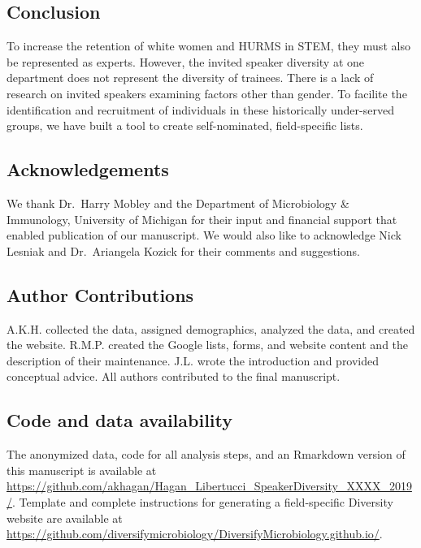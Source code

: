 \documentclass[10pt,]{article}
\begin{document}
\subsection{Conclusion}\label{conclusion}

To increase the retention of white women and HURMS in STEM, they must
also be represented as experts. However, the invited speaker diversity
at one department does not represent the diversity of trainees. There is
a lack of research on invited speakers examining factors other than
gender. To facilite the identification and recruitment of individuals in
these historically under-served groups, we have built a tool to create
self-nominated, field-specific lists.

\subsection{Acknowledgements}\label{acknowledgements}

We thank Dr.~Harry Mobley and the Department of Microbiology \&
Immunology, University of Michigan for their input and financial support
that enabled publication of our manuscript. We would also like to
acknowledge Nick Lesniak and Dr.~Ariangela Kozick for their comments and
suggestions.

\subsection{Author Contributions}\label{author-contributions}

A.K.H. collected the data, assigned demographics, analyzed the data, and
created the website. R.M.P. created the Google lists, forms, and website
content and the description of their maintenance. J.L. wrote the
introduction and provided conceptual advice. All authors contributed to
the final manuscript.

\subsection{Code and data
availability}\label{code-and-data-availability}

The anonymized data, code for all analysis steps, and an Rmarkdown
version of this manuscript is available at
\url{https://github.com/akhagan/Hagan_Libertucci_SpeakerDiversity_XXXX_2019/}.
Template and complete instructions for generating a field-specific
Diversity website are available at
\url{https://github.com/diversifymicrobiology/DiversifyMicrobiology.github.io/}.
\end{document}
